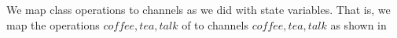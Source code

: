 We map \oz{} class operations to \picalc{} channels as we did with state variables. That is, we map the operations $coffee, tea, talk$  of  to \picalc{} channels $coffee, tea, talk$ as shown in 